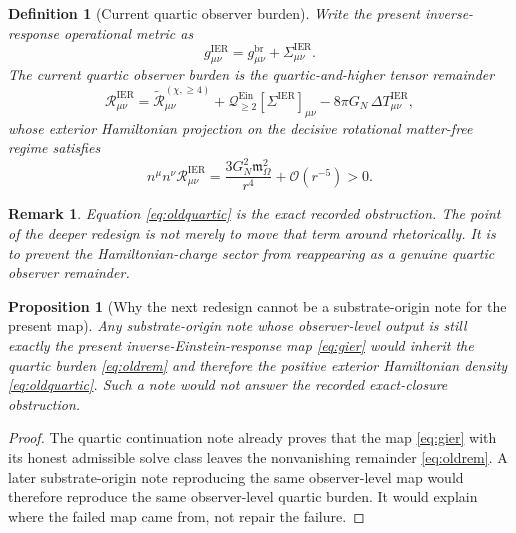 \documentclass[11pt]{article}
\newcommand{\ReBridge}{g^{\mathrm{br}}}
\newcommand{\OpMetricIER}{g^{\mathrm{IER}}}
\newcommand{\SigmaIER}{\Sigma^{\mathrm{IER}}}
\newcommand{\ReLongFour}{\widetilde{\mathcal R}_{\mu\nu}^{(\chi,\ge 4)}}
\newcommand{\EinQuad}{\mathcal Q_{\ge 2}^{\mathrm{Ein}}}
\newcommand{\HamChargeOmega}{\mathfrak m_{\Omega}}
\newtheorem{definition}{Definition}
\newtheorem{proposition}{Proposition}
\newtheorem{remark}{Remark}
\begin{document}
\begin{definition}[Current quartic observer burden]
\label{def:quarticburden}
Write the present inverse-response operational metric as
\begin{equation}
\OpMetricIER_{\mu\nu}
=
\ReBridge_{\mu\nu}
+\SigmaIER_{\mu\nu}.
\label{eq:gier}
\end{equation}
The \emph{current quartic observer burden} is the quartic-and-higher tensor remainder
\begin{equation}
\mathcal R_{\mu\nu}^{\mathrm{IER}}
=
\ReLongFour
+\EinQuad[\SigmaIER]_{\mu\nu}
-8\pi G_N\,\Delta T_{\mu\nu}^{\mathrm{IER}},
\label{eq:oldrem}
\end{equation}
whose exterior Hamiltonian projection on the decisive rotational matter-free regime satisfies
\begin{equation}
n^\mu n^\nu \mathcal R_{\mu\nu}^{\mathrm{IER}}
=
\frac{3G_N^2\HamChargeOmega^2}{r^4}
+\mathcal O(r^{-5})
>0.
\label{eq:oldquartic}
\end{equation}
\end{definition}

\begin{remark}
Equation \eqref{eq:oldquartic} is the exact recorded obstruction. The point of the deeper redesign is not merely to move that term around rhetorically. It is to prevent the Hamiltonian-charge sector from reappearing as a genuine quartic observer remainder.
\end{remark}

\begin{proposition}[Why the next redesign cannot be a substrate-origin note for the present map]
\label{prop:notsubstrate}
Any substrate-origin note whose observer-level output is still exactly the present inverse-Einstein-response map \eqref{eq:gier} would inherit the quartic burden \eqref{eq:oldrem} and therefore the positive exterior Hamiltonian density \eqref{eq:oldquartic}. Such a note would not answer the recorded exact-closure obstruction.
\end{proposition}

\begin{proof}
The quartic continuation note already proves that the map \eqref{eq:gier} with its honest admissible solve class leaves the nonvanishing remainder \eqref{eq:oldrem}. A later substrate-origin note reproducing the same observer-level map would therefore reproduce the same observer-level quartic burden. It would explain where the failed map came from, not repair the failure.
\end{proof}
\end{document}
